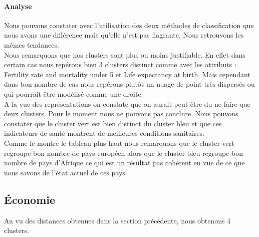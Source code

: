 \paragraph{Analyse}
Nous pouvons constater avec l'utilisation des deux méthodes de classification que nous avons une différence mais qu'elle n'est pas flagrante. Nous retrouvons les mêmes tendances.\\
Nous remarquons que nos clusters sont plus ou moins justifiable. En effet dans certain cas nous repérons bien 3 clusters distinct comme avec les attributs : Fertility rate and mortality under 5 et Life expectancy at birth. Mais cependant dans bon nombre de cas nous repérons plutôt un nuage de point très dispersés ou qui pourrait être modélisé comme une droite.\\
A la vue des représentations on constate que on aurait peut être du ne faire que deux clusters. Pour le moment nous ne pouvons pas conclure. Nous pouvons constater que le cluster vert est bien distinct du cluster bleu et que ces indicateurs de santé montrent de meilleures conditions  sanitaires.\\
Comme le montre le tableau plus haut nous remarquons que le cluster vert regroupe bon nombre de pays européen alors que le cluster bleu regroupe bon nombre de pays d'Afrique ce qui est un résultat pas cohérent en vue de ce que nous savons de l'état actuel de ces pays.


\subsection{Économie}
Au vu des distances obtenues dans la section précédente, nous obtenons 4 clusters.

